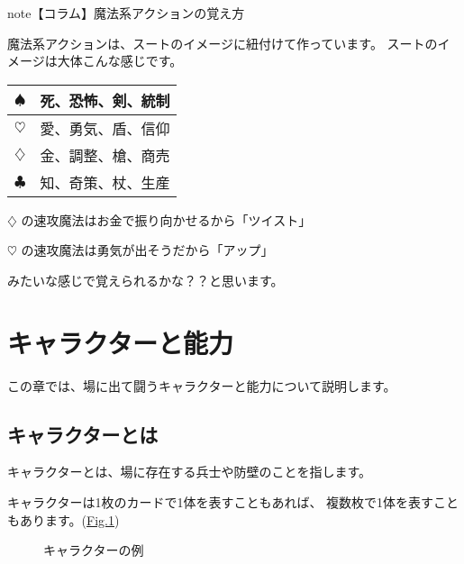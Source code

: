 \documentclass[letterpaper,10pt,dvipdfmx]{sphinxmanual}
\begin{document}
\begin{sphinxadmonition}{note}{【コラム】魔法系アクションの覚え方}

魔法系アクションは、スートのイメージに紐付けて作っています。
スートのイメージは大体こんな感じです。


\begin{savenotes}\sphinxattablestart
\centering
\begin{tabulary}{\linewidth}[t]{|T|T|}
\hline

{\normalsize $\spadesuit$} 
&
死、恐怖、剣、統制
\\
\hline
{\normalsize $\heartsuit$} 
&
愛、勇気、盾、信仰
\\
\hline
{\normalsize $\diamondsuit$} 
&
金、調整、槍、商売
\\
\hline
{\normalsize $\clubsuit$} 
&
知、奇策、杖、生産
\\
\hline
\end{tabulary}
\par
\sphinxattableend\end{savenotes}

{\normalsize $\diamondsuit$} の速攻魔法はお金で振り向かせるから「ツイスト」

{\normalsize $\heartsuit$} の速攻魔法は勇気が出そうだから「アップ」

みたいな感じで覚えられるかな？？と思います。
\end{sphinxadmonition}


\section{キャラクターと能力}
\label{\detokenize{common/04-character:id1}}\label{\detokenize{common/04-character::doc}}
この章では、場に出て闘うキャラクターと能力について説明します。


\subsection{キャラクターとは}
\label{\detokenize{common/04-character:id2}}
キャラクターとは、場に存在する兵士や防壁のことを指します。

キャラクターは1枚のカードで1体を表すこともあれば、
複数枚で1体を表すこともあります。(\hyperref[\detokenize{common/04-character:character}]{Fig.\@ \ref{\detokenize{common/04-character:character}}})

\begin{figure}[htbp]
\centering
\capstart

\noindent{}
\caption{キャラクターの例}\label{\detokenize{common/04-character:id10}}\label{\detokenize{common/04-character:character}}\end{figure}
\end{document}
